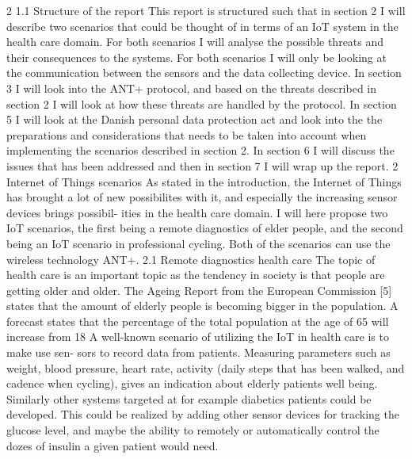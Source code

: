 2
1.1 Structure of the report
This report is structured such that in section 2 I will describe two scenarios that could be thought of in terms of an IoT system in the health care domain. For both scenarios I will analyse the possible threats and their consequences to the systems. For both scenarios I will only be looking at the communication between the sensors and the data collecting device. In section 3 I will look into the ANT+ protocol, and based on the threats described in section 2 I will look at how these threats are handled by the protocol. In section 5 I will look at the Danish personal data protection act and look into the the preparations and considerations that needs to be taken into account when implementing the scenarios described in section 2. In section 6 I will discuss the issues that has been addressed and then in section 7 I will wrap up the report.
2 Internet of Things scenarios
As stated in the introduction, the Internet of Things has brought a lot of new possibilites with it, and especially the increasing sensor devices brings possibil- ities in the health care domain. I will here propose two IoT scenarios, the first being a remote diagnostics of elder people, and the second being an IoT scenario in professional cycling. Both of the scenarios can use the wireless technology ANT+.
2.1 Remote diagnostics health care
The topic of health care is an important topic as the tendency in society is that people are getting older and older. The Ageing Report from the European Commission [5] states that the amount of elderly people is becoming bigger in the population. A forecast states that the percentage of the total population at the age of 65 will increase from 18%
A well-known scenario of utilizing the IoT in health care is to make use sen- sors to record data from patients. Measuring parameters such as weight, blood pressure, heart rate, activity (daily steps that has been walked, and cadence when cycling), gives an indication about elderly patients well being. Similarly other systems targeted at for example diabetics patients could be developed. This could be realized by adding other sensor devices for tracking the glucose level, and maybe the ability to remotely or automatically control the dozes of insulin a given patient would need.
